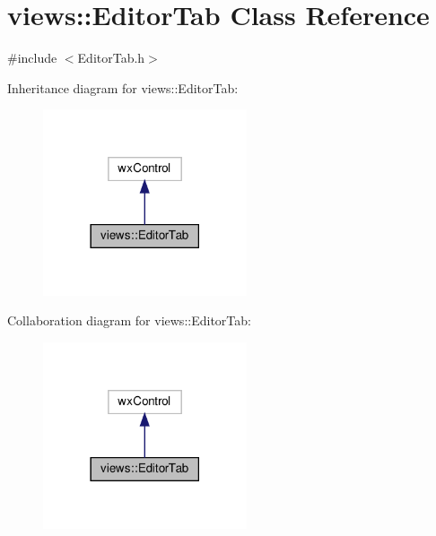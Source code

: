 \hypertarget{classviews_1_1_editor_tab}{}\section{views\+:\+:Editor\+Tab Class Reference}
\label{classviews_1_1_editor_tab}


{\ttfamily \#include $<$Editor\+Tab.\+h$>$}



Inheritance diagram for views\+:\+:Editor\+Tab\+:
\nopagebreak
\begin{figure}[H]
\begin{center}
\leavevmode
\includegraphics[width=170pt]{classviews_1_1_editor_tab__inherit__graph}
\end{center}
\end{figure}


Collaboration diagram for views\+:\+:Editor\+Tab\+:
\nopagebreak
\begin{figure}[H]
\begin{center}
\leavevmode
\includegraphics[width=170pt]{classviews_1_1_editor_tab__coll__graph}
\end{center}
\end{figure}
